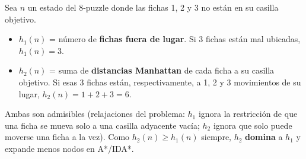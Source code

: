 \begin{example}
    Sea $n$ un estado del 8-puzzle donde las fichas 1, 2 y 3 no están en su casilla objetivo.
    \begin{itemize}
        \item $h_1(n)$ = número de \textbf{fichas fuera de lugar}. Si 3 fichas están mal ubicadas, $h_1(n)=3$.
        \item $h_2(n)$ = suma de \textbf{distancias Manhattan} de cada ficha a su casilla objetivo. Si esas 3 fichas
        están, respectivamente, a 1, 2 y 3 movimientos de su lugar, $h_2(n) = 1+2+3 = 6$.
    \end{itemize}
    Ambas son admisibles (relajaciones del problema: $h_1$ ignora la restricción de que una ficha se mueva solo a una
    casilla adyacente vacía; $h_2$ ignora que solo puede moverse una ficha a la vez). Como $h_2(n) \geq h_1(n)$
    siempre, $h_2$ \textbf{domina} a $h_1$ y expande menos nodos en A*/IDA*.
\end{example}
